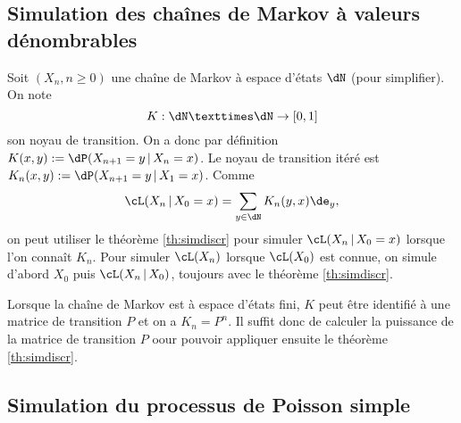 %
%
%

\subsection{Simulation des chaînes de Markov à valeurs dénombrables}

Soit $(X_n,n\geq 0)$ une chaîne de Markov à espace d'états $\dN$ (pour
simplifier). On note
$$K:\dN× \dN\to[0,1]$$
son noyau de transition. On a donc par définition
$K(x,y):=\dP(X_{n+1}=y\,|\,X_n=x)$. Le noyau de transition itéré est
$K_n(x,y):=\dP(X_{n+1}=y\,|\,X_1=x)$. Comme
$$\cL(X_n\,|\,X_0=x)=\sum_{y\in\dN}K_n(y,x)\de_y,$$
on peut utiliser le théorème
\ref{th:simdiscr} pour simuler $\cL(X_n\,|\,X_0=x)$ lorsque l'on connaît
$K_n$. Pour simuler $\cL(X_n)$ lorsque $\cL(X_0)$ est connue, on simule
d'abord $X_0$ puis $\cL(X_n\,|\,X_0)$, toujours avec le théorème
\ref{th:simdiscr}.

Lorsque la chaîne de Markov est à espace d'états fini, $K$ peut être identifié
à une matrice de transition $P$ et on a $K_n=P^n$. Il suffit donc de calculer
la puissance de la matrice de transition $P$ oour pouvoir appliquer
ensuite le théorème \ref{th:simdiscr}. 

\subsection{Simulation du processus de Poisson simple}

